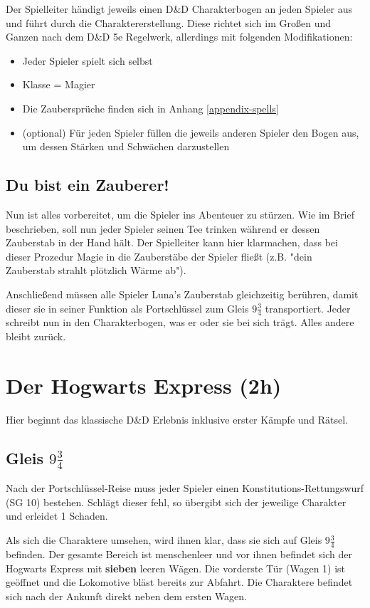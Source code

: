 \documentclass[]{scrartcl}
\begin{document}
Der Spielleiter händigt jeweils einen D\&D Charakterbogen an jeden Spieler aus und führt durch die Charaktererstellung. Diese richtet sich im Großen und Ganzen nach dem D\&D 5e Regelwerk, allerdings mit folgenden Modifikationen:
\begin{itemize}
	\item Jeder Spieler spielt sich selbst
	\item Klasse = Magier
	\item Die Zaubersprüche finden sich in Anhang \ref{appendix-spells}
	\item (optional) Für jeden Spieler füllen die jeweils anderen Spieler den Bogen aus, um dessen Stärken und Schwächen darzustellen
\end{itemize}

\subsection{Du bist ein Zauberer!}

Nun ist alles vorbereitet, um die Spieler ins Abenteuer zu stürzen. Wie im Brief beschrieben, soll nun jeder Spieler seinen Tee trinken während er dessen Zauberstab in der Hand hält. Der Spielleiter kann hier klarmachen, dass bei dieser Prozedur Magie in die Zauberstäbe der Spieler fließt (z.B. "dein Zauberstab strahlt plötzlich Wärme ab").

Anschließend müssen alle Spieler Luna's Zauberstab gleichzeitig berühren, damit dieser sie in seiner Funktion als Portschlüssel zum Gleis $9\frac{3}{4}$ transportiert. Jeder schreibt nun in den Charakterbogen, was er oder sie bei sich trägt. Alles andere bleibt zurück.

\section{Der Hogwarts Express (2h)}

Hier beginnt das klassische D\&D Erlebnis inklusive erster Kämpfe und Rätsel.

\subsection{\label{platform934}Gleis $9\frac{3}{4}$}

Nach der Portschlüssel-Reise muss jeder Spieler einen Konstitutions-Rettungswurf (SG 10) bestehen. Schlägt dieser fehl, so übergibt sich der jeweilige Charakter und erleidet 1 Schaden.

Als sich die Charaktere umsehen, wird ihnen klar, dass sie sich auf Gleis $9\frac{3}{4}$ befinden. Der gesamte Bereich ist menschenleer und vor ihnen befindet sich der Hogwarts Express mit {\bfseries sieben} leeren Wägen. Die vorderste Tür (Wagen 1) ist geöffnet und die Lokomotive bläst bereits zur Abfahrt. Die Charaktere befindet sich nach der Ankunft direkt neben dem ersten Wagen.
\end{document}
